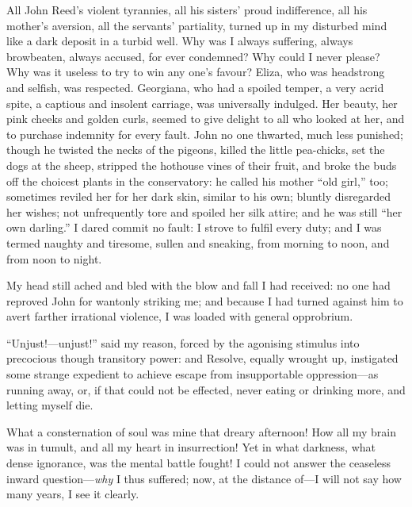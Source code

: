 All John Reed's violent tyrannies, all his sisters' proud indifference,
all his mother's aversion, all the servants' partiality, turned up in my
disturbed mind like a dark deposit in a turbid well.  Why was I always
suffering, always browbeaten, always accused, for ever condemned?  Why
could I never please?  Why was it useless to try to win any one's
favour?  Eliza, who was headstrong and selfish, was respected.
Georgiana, who had a spoiled temper, a very acrid spite, a captious and
insolent carriage, was universally indulged.  Her beauty, her pink
cheeks and golden curls, seemed to give delight to all who looked at
her, and to purchase indemnity for every fault.  John no one thwarted,
much less punished; though he twisted the necks of the pigeons, killed
the little pea-chicks, set the dogs at the sheep, stripped the hothouse
vines of their fruit, and broke the buds off the choicest plants in the
conservatory: he called his mother \enquote{old girl,} too; sometimes
reviled her for her dark skin, similar to his own; bluntly disregarded
her wishes; not unfrequently tore and spoiled her silk attire; and he
was still \enquote{her own darling.}  I dared commit no fault: I strove
to fulfil every duty; and I was termed naughty and tiresome, sullen and
sneaking, from morning to noon, and from noon to night.

My head still ached and bled with the blow and fall I had received: no
one had reproved John for wantonly striking me; and because I had turned
against him to avert farther irrational violence, I was loaded with
general opprobrium.

\enquote{Unjust!---unjust!} said my reason, forced by the agonising
stimulus into precocious though transitory power: and Resolve, equally
wrought up, instigated some strange expedient to achieve escape from
insupportable oppression---as running away, or, if that could not be
effected, never eating or drinking more, and letting myself die.

What a consternation of soul was mine that dreary afternoon!  How all my
brain was in tumult, and all my heart in insurrection!  Yet in what
darkness, what dense ignorance, was the mental battle fought!  I could
not answer the ceaseless inward question---\emph{why} I thus suffered;
now, at the distance of---I will not say how many years, I see it
clearly.

